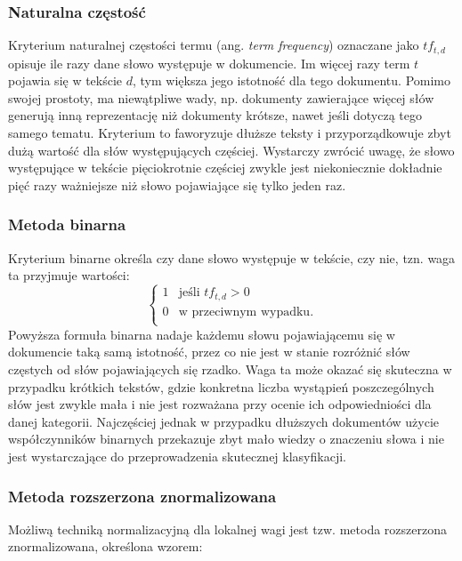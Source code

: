 \documentclass{pracamgr}
\begin{document}
\subsubsection*{Naturalna częstość}

Kryterium naturalnej częstości termu (ang. \textit{term frequency}) oznaczane jako $tf_{t,d}$ opisuje ile razy dane słowo występuje w dokumencie. Im więcej razy term $t$ pojawia się w tekście $d$, tym większa jego istotność dla tego dokumentu. Pomimo swojej prostoty, ma niewątpliwe wady, np. dokumenty zawierające więcej słów generują inną reprezentację niż dokumenty krótsze, nawet jeśli dotyczą tego samego tematu. Kryterium to faworyzuje dłuższe teksty i przyporządkowuje zbyt dużą wartość dla słów występujących częściej. Wystarczy zwrócić uwagę, że słowo występujące w tekście pięciokrotnie częściej zwykle jest niekoniecznie dokładnie pięć razy ważniejsze niż słowo pojawiające się tylko jeden raz.

\subsubsection*{Metoda binarna}

Kryterium binarne określa czy dane słowo występuje w tekście, czy nie, tzn. waga ta przyjmuje wartości:
\[ 
\begin{cases} 
    1 & \text{jeśli } tf_{t,d} > 0 \\ 
    0 & \text{w przeciwnym wypadku.} \\ 
\end{cases} 
\] 
Powyższa formuła binarna nadaje każdemu słowu pojawiającemu się w dokumencie taką samą istotność, przez co nie jest w stanie rozróżnić słów częstych od słów pojawiających się rzadko. Waga ta może okazać się skuteczna w przypadku krótkich tekstów, gdzie konkretna liczba wystąpień poszczególnych słów jest zwykle mała i nie jest rozważana przy ocenie ich odpowiedniości dla danej kategorii. Najczęściej jednak w przypadku dłuższych dokumentów użycie współczynników binarnych przekazuje zbyt mało wiedzy o znaczeniu słowa i nie jest wystarczające do przeprowadzenia skutecznej klasyfikacji.

\subsubsection*{Metoda rozszerzona znormalizowana}

Możliwą techniką normalizacyjną dla lokalnej wagi jest tzw. metoda rozszerzona znormalizowana, określona wzorem:
\end{document}
